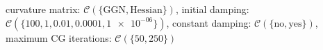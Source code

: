 curvature matrix: $\mathcal{C}(\{\text{GGN},\text{Hessian}\})$, initial damping: $\mathcal{C}(\{\num[scientific-notation=false]{100},\num[scientific-notation=false]{1},\num[scientific-notation=true]{0.01},\num[scientific-notation=true]{0.0001},\num[scientific-notation=true]{1e-06}\})$, constant damping: $\mathcal{C}(\{\text{no},\text{yes}\})$, maximum CG iterations: $\mathcal{C}(\{\num[scientific-notation=false]{50},\num[scientific-notation=false]{250}\})$